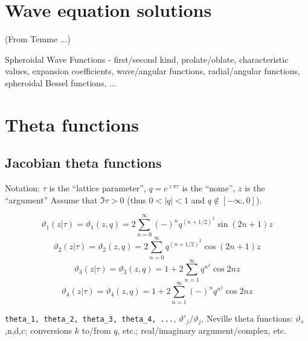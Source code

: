 \documentclass[10pt,dvipdfmx,letterpaper,twoside]{article}
\newcommand{\ii}{{\hat{\imath}}}
\let\theta=\vartheta
\begin{document}
\section{Wave equation solutions}
(From Temme ...)

Spheroidal Wave Functions
- first/second kind, prolate/oblate, characteristic values, expansion coefficients, wave/angular functions,
radial/angular functions, spheroidal Bessel functions, ...

\section{Theta functions}

\subsection{Jacobian theta functions}

Notation: $\tau$ is the ``lattice parameter'', $q=e^{\ii\pi\tau}$ is the ``nome'', $z$ is the ``argument''
Assume that $\Im\tau > 0$ (thus $0<|q|<1$ and $q\notin[-\infty,0]$).

\[ \theta_1(z|\tau) = \theta_1(z,q) = 2\sum_{n=0}^\infty(-)^n q^{(n+1/2)^2}\sin (2n+1)z \]
\[ \theta_2(z|\tau) = \theta_2(z,q) = 2\sum_{n=0}^\infty q^{(n+1/2)^2}\cos (2n+1)z \]
\[ \theta_3(z|\tau) = \theta_3(z,q) = 1 + 2\sum_{n=1}^\infty q^{n^2}\cos 2nz \]
\[ \theta_4(z|\tau) = \theta_4(z,q) = 1 + 2\sum_{n=1}^\infty(-)^n q^{n^2}\cos 2nz \]

{\tt theta\_1, theta\_2, theta\_3, theta\_4, ...}, $\theta'_j/\theta_j$, Neville theta functions: $\theta_s$,n,d,c;
conversions $k$ to/from $q$, etc.; real/imaginary argument/complex, etc.
\end{document}
